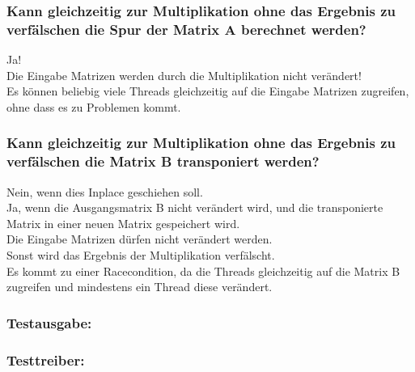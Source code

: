 \documentclass[a4paper,12pt]{article}
\begin{document}
\subsubsection{Kann gleichzeitig zur Multiplikation ohne das Ergebnis zu verfälschen die Spur der Matrix A berechnet werden?}
Ja!\\
Die Eingabe Matrizen werden durch die Multiplikation nicht verändert!\\
Es können beliebig viele Threads gleichzeitig auf die Eingabe Matrizen zugreifen, ohne dass es zu Problemen kommt.\\

\subsubsection{Kann gleichzeitig zur Multiplikation ohne das Ergebnis zu verfälschen die Matrix B transponiert werden?}
Nein, wenn dies Inplace geschiehen soll.\\
Ja, wenn die Ausgangsmatrix B nicht verändert wird, und die transponierte Matrix in einer neuen Matrix gespeichert wird.\\
Die Eingabe Matrizen dürfen nicht verändert werden.\\
Sonst wird das Ergebnis der Multiplikation verfälscht.\\
Es kommt zu einer Racecondition, da die Threads gleichzeitig auf die Matrix B zugreifen und mindestens ein Thread diese verändert.\\
\subsubsection{Testausgabe:}

\newpage
\subsubsection{Testtreiber:}

\end{document}
